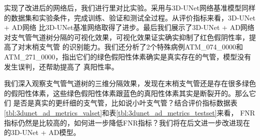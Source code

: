 实现了改进后的网络后，我们进行里对比实验。采用与3D-UNet网络基准模型同样的数据集和实验条件，完成训练、验证和测试全过程。从评价指标来看，3D-UNet + AD网络
比3D-UNet基准网络取得了进步。最后我们展示了3D-UNet + AD网络对支气管气道树分隔的可视化效果，可视化效果证实确实抑制了红色假阴性率，提高了对末梢支气管
的识别能力。我们还分析了2个特殊病例ATM\_074\_0000和ATM\_271\_0000，指出它们的绿色假阳性体素确实是真实存在的气管，模型没有发生误判，还帮助提高了
真阳性率。

我们深入观察支气管气道树的三维分隔效果，发现在末梢支气管还是存在很多绿色的假阳性体素，这些绿色假阳性体素跟蓝色的真阳性体素其实是断裂开的。那么它们
是否是真实的更纤细的支气管，比如说小叶支气管？结合评价指标数据表\ref{tbl:3dunet_ad_metrics_valset}和表\ref{tbl:3dunet_ad_metrics_testset}来看，
FNR指标仍然是比较高的，如何进一步降低FNR指标？我们将在后文进一步改进现在的3D-UNet + AD模型。